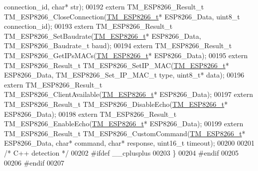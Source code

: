 \begin{DoxyCode}
      connection\_id, \textcolor{keywordtype}{char}* str);
00192 \textcolor{keyword}{extern} TM\_ESP8266\_Result\_t TM\_ESP8266\_CloseConnection(\hyperlink{struct_t_m___e_s_p8266__t}{TM\_ESP8266\_t}* ESP8266\_Data, uint8\_t 
      connection\_id);
00193 \textcolor{keyword}{extern} TM\_ESP8266\_Result\_t TM\_ESP8266\_SetBaudrate(\hyperlink{struct_t_m___e_s_p8266__t}{TM\_ESP8266\_t}* ESP8266\_Data, 
      TM\_ESP8266\_Baudrate\_t baud);
00194 \textcolor{keyword}{extern} TM\_ESP8266\_Result\_t TM\_ESP8266\_GetIPsMACs(\hyperlink{struct_t_m___e_s_p8266__t}{TM\_ESP8266\_t}* ESP8266\_Data);
00195 \textcolor{keyword}{extern} TM\_ESP8266\_Result\_t TM\_ESP8266\_SetIP\_MAC(\hyperlink{struct_t_m___e_s_p8266__t}{TM\_ESP8266\_t}* ESP8266\_Data, 
      TM\_ESP8266\_Set\_IP\_MAC\_t type, uint8\_t* data);
00196 \textcolor{keyword}{extern} TM\_ESP8266\_Result\_t TM\_ESP8266\_ClientAvailable(\hyperlink{struct_t_m___e_s_p8266__t}{TM\_ESP8266\_t}* ESP8266\_Data);
00197 \textcolor{keyword}{extern} TM\_ESP8266\_Result\_t TM\_ESP8266\_DisableEcho(\hyperlink{struct_t_m___e_s_p8266__t}{TM\_ESP8266\_t}* ESP8266\_Data);
00198 \textcolor{keyword}{extern} TM\_ESP8266\_Result\_t TM\_ESP8266\_EnableEcho(\hyperlink{struct_t_m___e_s_p8266__t}{TM\_ESP8266\_t}* ESP8266\_Data);
00199 \textcolor{keyword}{extern} TM\_ESP8266\_Result\_t TM\_ESP8266\_CustomCommand(\hyperlink{struct_t_m___e_s_p8266__t}{TM\_ESP8266\_t}* ESP8266\_Data, \textcolor{keywordtype}{char}* command, \textcolor{keywordtype}{
      char}* response, uint16\_t timeout);
00200     
00201 \textcolor{comment}{/* C++ detection */}
00202 \textcolor{preprocessor}{#ifdef \_\_cplusplus}
00203 \}
00204 \textcolor{preprocessor}{#endif}
00205 
00206 \textcolor{preprocessor}{#endif}
00207 
\end{DoxyCode}
